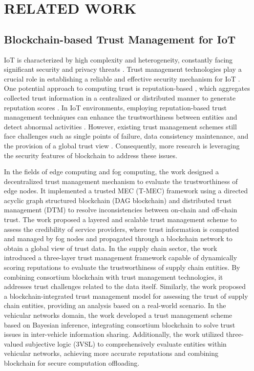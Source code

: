 \section{RELATED WORK}
\subsection{Blockchain-based Trust Management for IoT}
IoT is characterized by high complexity and heterogeneity, constantly facing significant security and privacy threats \cite{ray2018survey}. Trust management technologies play a crucial role in establishing a reliable and effective security mechanism for IoT \cite{roman2011securing}. One potential approach to computing trust is reputation-based \cite{aaqib2023iot}, which aggregates collected trust information in a centralized or distributed manner to generate reputation scores \cite{pourghebleh2019comprehensive}. In IoT environments, employing reputation-based trust management techniques can enhance the trustworthiness between entities and detect abnormal activities \cite{alzaid2013reputation}. However, existing trust management schemes still face challenges such as single points of failure, data consistency maintenance, and the provision of a global trust view \cite{liu2023survey}. Consequently, more research is leveraging the security features of blockchain to address these issues.

In the fields of edge computing and fog computing, the work \cite{yang2023trusted} designed a decentralized trust management mechanism to evaluate the trustworthiness of edge nodes. It implemented a trusted MEC (T-MEC) framework using a directed acyclic graph structured blockchain (DAG blockchain) and distributed trust management (DTM) to resolve inconsistencies between on-chain and off-chain trust. The work \cite{kouicem2020decentralized} proposed a layered and scalable trust management scheme to assess the credibility of service providers, where trust information is computed and managed by fog nodes and propagated through a blockchain network to obtain a global view of trust data. In the supply chain sector, the work \cite{malik2019trustchain} introduced a three-layer trust management framework capable of dynamically scoring reputations to evaluate the trustworthiness of supply chain entities. By combining consortium blockchain with trust management technologies, it addresses trust challenges related to the data itself. Similarly, the work \cite{wu2022integrated} proposed a blockchain-integrated trust management model for assessing the trust of supply chain entities, providing an analysis based on a real-world scenario. In the vehicular networks domain, the work \cite{du2023blockchain} developed a trust management scheme based on Bayesian inference, integrating consortium blockchain to solve trust issues in inter-vehicle information sharing. Additionally, the work \cite{9336659} utilized three-valued subjective logic (3VSL) to comprehensively evaluate entities within vehicular networks, achieving more accurate reputations and combining blockchain for secure computation offloading.

